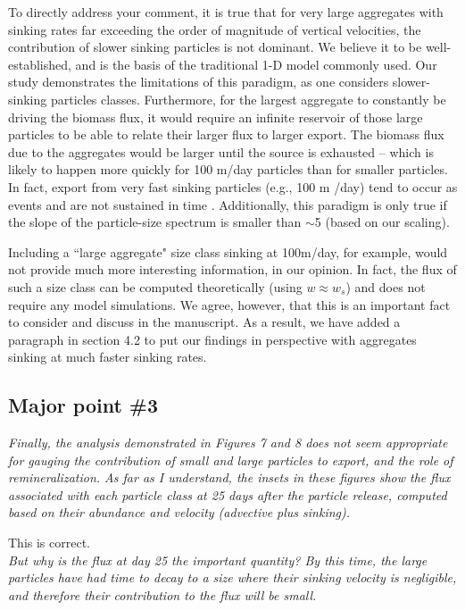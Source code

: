 \documentclass[12pt,letter]{article}
\begin{document}
To directly address your comment, it is true that for very large aggregates with sinking rates far exceeding the order of magnitude of vertical velocities, the contribution of slower sinking particles is not dominant. We believe it to be well-established, and is the basis of the traditional 1-D model commonly used. Our study demonstrates the limitations of this paradigm, as one considers slower-sinking particles classes. Furthermore, for the largest aggregate to constantly be driving the biomass flux, it would require an infinite reservoir of those large particles to be able to relate their larger flux to larger export. The biomass flux due to the aggregates would be larger until the source is exhausted -- which is likely to happen more quickly for 100 m/day particles than for smaller particles. In fact, export from very fast sinking particles (e.g., 100 m /day) tend to occur as events and are not sustained in time \citep{Kiko_2017}.
Additionally, this paradigm is only true if the slope of the particle-size spectrum is smaller than $\sim$5 (based on our scaling).

Including a ``large aggregate" size class sinking at 100m/day, for example, would not provide much more interesting information, in our opinion. In fact, the flux of such a size class can be computed theoretically (using $w \approx w_s$) and does not require any model simulations. We agree, however, that this is an important fact to consider and discuss in the manuscript. As a result, we have added a paragraph in section 4.2 to put our findings in perspective with aggregates sinking at much faster sinking rates.
	
\subsection*{Major point \#3}
 \textit{Finally, the analysis demonstrated in Figures 7 and 8 does not seem appropriate for gauging the contribution of small and large particles to export, and the role of remineralization. As far as I understand, the insets in these figures show the flux associated with each particle class at 25 days after the particle release, computed based on their abundance and velocity (advective plus sinking).\\}
 
This is correct.\\

 \textit{But why is the flux at day 25 the important quantity? By this time, the large particles have had time to decay to a size where their sinking velocity is negligible, and therefore their contribution to the flux will be small.}
 
\end{document}
